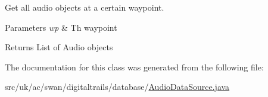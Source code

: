 Get all audio objects at a certain waypoint. 


\begin{DoxyParams}{Parameters}
{\em wp} & Th waypoint \\
\hline
\end{DoxyParams}
\begin{DoxyReturn}{Returns}
List of Audio objects 
\end{DoxyReturn}


The documentation for this class was generated from the following file\+:\begin{DoxyCompactItemize}
\item 
src/uk/ac/swan/digitaltrails/database/\hyperlink{_audio_data_source_8java}{Audio\+Data\+Source.\+java}\end{DoxyCompactItemize}

